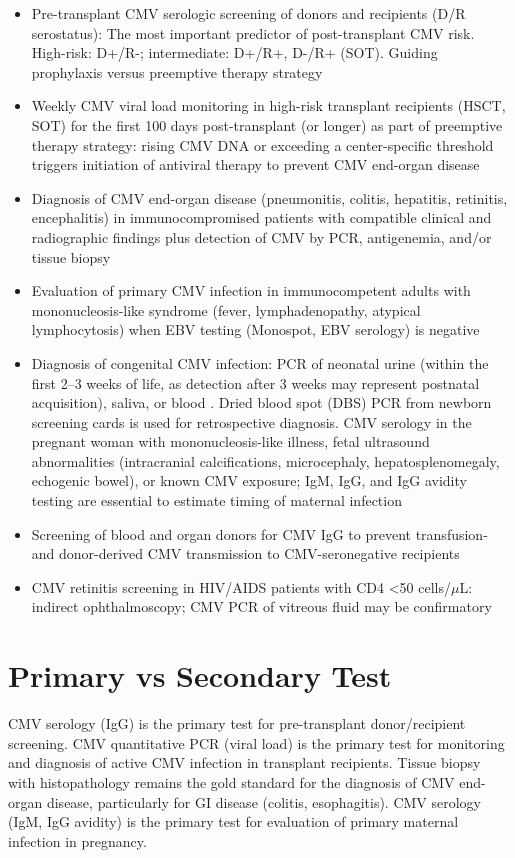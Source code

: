 \begin{itemize}
  \item Pre-transplant CMV serologic screening of donors and recipients (D/R serostatus): The most important predictor of post-transplant CMV risk. High-risk: D+/R-; intermediate: D+/R+, D-/R+ (SOT). Guiding prophylaxis versus preemptive therapy strategy \cite{kotton2018third}
  \item Weekly CMV viral load monitoring in high-risk transplant recipients (HSCT, SOT) for the first 100 days post-transplant (or longer) as part of preemptive therapy strategy: rising CMV DNA or exceeding a center-specific threshold triggers initiation of antiviral therapy to prevent CMV end-organ disease \cite{boeckh2009how}
  \item Diagnosis of CMV end-organ disease (pneumonitis, colitis, hepatitis, retinitis, encephalitis) in immunocompromised patients with compatible clinical and radiographic findings plus detection of CMV by PCR, antigenemia, and/or tissue biopsy
  \item Evaluation of primary CMV infection in immunocompetent adults with mononucleosis-like syndrome (fever, lymphadenopathy, atypical lymphocytosis) when EBV testing (Monospot, EBV serology) is negative
  \item Diagnosis of congenital CMV infection: PCR of neonatal urine (within the first 2--3 weeks of life, as detection after 3 weeks may represent postnatal acquisition), saliva, or blood \cite{rawlinson2017congenital}. Dried blood spot (DBS) PCR from newborn screening cards is used for retrospective diagnosis. CMV serology in the pregnant woman with mononucleosis-like illness, fetal ultrasound abnormalities (intracranial calcifications, microcephaly, hepatosplenomegaly, echogenic bowel), or known CMV exposure; IgM, IgG, and IgG avidity testing are essential to estimate timing of maternal infection \cite{lazzarotto2008new}
  \item Screening of blood and organ donors for CMV IgG to prevent transfusion- and donor-derived CMV transmission to CMV-seronegative recipients
  \item CMV retinitis screening in HIV/AIDS patients with CD4 <50 cells/$\mu$L: indirect ophthalmoscopy; CMV PCR of vitreous fluid may be confirmatory
\end{itemize}

\section*{Primary vs Secondary Test}
CMV serology (IgG) is the primary test for pre-transplant donor/recipient screening. CMV quantitative PCR (viral load) is the primary test for monitoring and diagnosis of active CMV infection in transplant recipients. Tissue biopsy with histopathology remains the gold standard for the diagnosis of CMV end-organ disease, particularly for GI disease (colitis, esophagitis). CMV serology (IgM, IgG avidity) is the primary test for evaluation of primary maternal infection in pregnancy.

